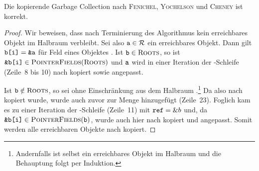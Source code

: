 \begin{mybox}
\begin{satz}
	Die kopierende Garbage Collection nach \textsc{Fenichel}, \textsc{Yochelson} und \textsc{Cheney} ist korrekt.
\end{satz}
\end{mybox}

\begin{proof}
	Wir beweisen, dass nach Terminierung des Algorithmus kein erreichbares Objekt im Halbraum  verbleibt.
	Sei also $\texttt{a} \in \mathcal{R}$ ein erreichbares Objekt.
	Dann gilt $\texttt{b[i]} = \texttt{\&a}$ für Feld  eines Objektes .
	Ist $\texttt{b} \in \textsc{Roots}$, so ist $\texttt{\&b[i]} \in \textsc{PointerFields}(\textsc{Roots})$ und $\texttt{a}$ wird in einer Iteration der \FOREACH-Schleife (Zeile~8 bis 10) nach  kopiert sowie  angepasst.
	
	Ist $\texttt{b} \notin \textsc{Roots}$, so sei  ohne Einschränkung aus dem Halbraum .\footnote{Andernfalls ist  selbst ein erreichbares Objekt im Halbraum  und die Behauptung folgt per Induktion.}
	Da  also nach  kopiert wurde, wurde  auch zuvor zur Menge  hinzugefügt (Zeile~23).
	Foglich kam es zu einer Iteration der \WHILE-Schleife (Zeile~11) mit $\texttt{ref} = \&b$ und, da $\texttt{\&b[i]} \in \textsc{PointerFields}(\texttt{b})$, wurde auch hier  nach  kopiert und  angepasst.
	Somit werden alle erreichbaren Objekte nach  kopiert.	
\end{proof}